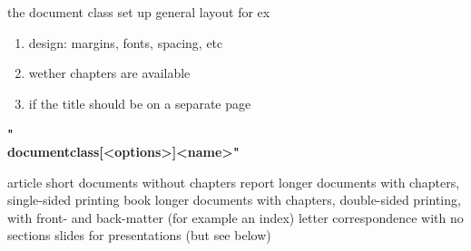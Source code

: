 \documentclass[a4paper, 12pt]{book}
\begin{document}
the document class set up general layout for ex
\begin{enumerate}
    \item design: margins, fonts, spacing, etc
    \item wether chapters are available
    \item if the title should be on a separate page
\end{enumerate}
\textbf{"\\documentclass[<options>]{<name>}"}

    article
    short documents without chapters
    report
    longer documents with chapters, single-sided printing
    book
    longer documents with chapters, double-sided printing, with front- and back-matter (for example an index)
    letter
    correspondence with no sections
    slides
    for presentations (but see below)
\end{document}
